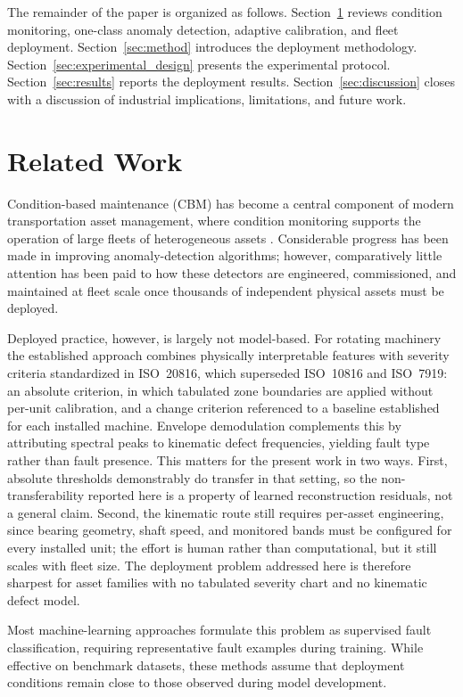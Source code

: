\documentclass[numbered]{trbunofficial}
\begin{document}
The remainder of the paper is organized as follows. Section~\ref{sec:related} reviews condition
monitoring, one-class anomaly detection, adaptive calibration, and fleet deployment.
Section~\ref{sec:method} introduces the deployment methodology.
Section~\ref{sec:experimental_design} presents the experimental protocol.
Section~\ref{sec:results} reports the deployment results.
Section~\ref{sec:discussion} closes with a discussion of industrial implications, limitations,
and future work.

\section{Related Work}
\label{sec:related}

Condition-based maintenance (CBM) has become a central component of modern
transportation asset management, where condition monitoring supports the
operation of large fleets of heterogeneous assets
\citep{jardine2006,chandola2009,zhao2019}. Considerable progress has been made
in improving anomaly-detection algorithms; however, comparatively little
attention has been paid to how these detectors are engineered, commissioned,
and maintained at fleet scale once thousands of independent physical assets
must be deployed.

Deployed practice, however, is largely not model-based. For rotating
machinery the established approach combines physically interpretable
features with severity criteria standardized in ISO~20816, which superseded
ISO~10816 and ISO~7919: an absolute criterion, in which tabulated zone
boundaries are applied without per-unit calibration, and a change criterion
referenced to a baseline established for each installed machine. Envelope
demodulation complements this by attributing spectral peaks to kinematic
defect frequencies, yielding fault type rather than fault presence. This
matters for the present work in two ways. First, absolute thresholds
demonstrably do transfer in that setting, so the non-transferability
reported here is a property of learned reconstruction residuals, not a
general claim. Second, the kinematic route still requires per-asset
engineering, since bearing geometry, shaft speed, and monitored bands must
be configured for every installed unit; the effort is human rather than
computational, but it still scales with fleet size. The deployment problem
addressed here is therefore sharpest for asset families with no tabulated
severity chart and no kinematic defect model.

Most machine-learning approaches formulate this problem as supervised fault
classification, requiring representative fault examples during training.
While effective on benchmark datasets, these methods assume that deployment
conditions remain close to those observed during model development.
\end{document}
